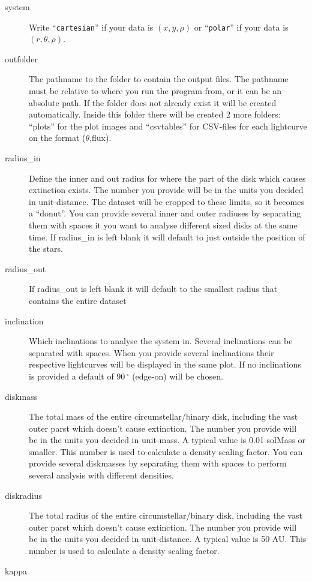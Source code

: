 \documentclass[a4paper, 12pt, english, titlepage]{article}
\newcommand{\degree}{\, ^\circ}    %
\begin{document}
\begin{description}
        \item[system]
            Write ``\texttt{cartesian}'' if your data is $(x,y,\rho)$ or ``\texttt{polar}'' if your data is $(r,\theta,\rho)$.
        \item[outfolder]
            The pathname to the folder to contain the output files. The pathname must be relative to where you run the program from, or it can be an absolute path. If the folder does not already exist it will be created automatically. Inside this folder there will be created 2 more folders: ``plots'' for the plot images and ``csvtables'' for CSV-files for each lightcurve on the format ($\theta$,flux).
        \item[radius\_in]
            Define the inner and out radius for where the part of the disk which causes extinction exists. The number you provide will be in the units you decided in unit-distance. The dataset will be cropped to these limits, so it becomes a ``donut''. You can provide several inner and outer radiuses by separating them with spaces it you want to analyse different sized disks at the same time. If radius\_in is left blank it will default to just outside the position of the stars.
        \item[radius\_out]
            If radius\_out is left blank it will default to the smallest radius that contains the entire dataset
        \item[inclination]
            Which inclinations to analyse the system in. Several inclinations can be separated with spaces. When you provide several inclinations their respective lightcurves will be displayed in the same plot. If no inclinations is provided a default of $90\degree$ (edge-on) will be chosen.
        \item[diskmass]
            The total mass of the entire circumstellar/binary disk, including the vast outer parst which doesn't cause extinction. The number you provide will be in the units you decided in unit-mass. A typical value is 0.01 solMass or smaller. This number is used to calculate a density scaling factor. You can provide several diskmasses by separating them with spaces to perform several analysis with different densities.
        \item[diskradius]
            The total radius of the entire circumstellar/binary disk, including the vast outer parst which doesn't cause extinction. The number you provide will be in the units you decided in unit-distance. A typical value is 50 AU. This number is used to calculate a density scaling factor.
        \item[kappa]

\end{description}
\end{document}
